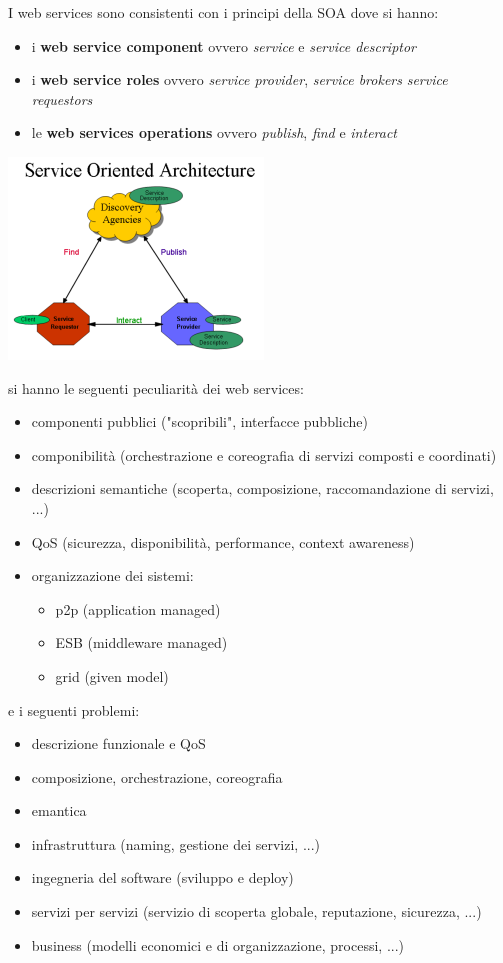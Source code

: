 \documentclass[a4paper,12pt, oneside]{book}
\begin{document}
I web services sono consistenti con i principi della SOA dove si hanno:
\begin{itemize}
\item i \textbf{web service component} ovvero \textit{service} e \textit{service descriptor}
\item i \textbf{web service roles} ovvero \textit{service provider}, \textit{service brokers} \textit{service requestors}
\item le \textbf{web services operations} ovvero \textit{publish}, \textit{find} e \textit{interact}
\end{itemize}
\begin{center}
\includegraphics[scale=1]{img/soa.png}
\end{center}
si hanno le seguenti peculiarità dei web services:
\begin{itemize}
\item componenti pubblici ("scopribili", interfacce pubbliche)
\item componibilità (orchestrazione e coreografia di servizi composti e coordinati)
\item descrizioni semantiche (scoperta, composizione, raccomandazione di servizi, ...)
\item QoS (sicurezza, disponibilità, performance, context awareness)
\item organizzazione dei sistemi:
  \begin{itemize}
    \item p2p (application managed)
    \item ESB (middleware managed)
    \item grid (given model)
  \end{itemize}
\end{itemize}
e i seguenti problemi:
\begin{itemize}
\item descrizione funzionale e QoS
\item composizione, orchestrazione, coreografia
\item emantica
\item infrastruttura (naming, gestione dei servizi, ...)
\item ingegneria del software (sviluppo e deploy)
\item servizi per servizi (servizio di scoperta globale, reputazione, sicurezza, ...)
\item business (modelli economici e di organizzazione, processi, ...)
\end{itemize}
\end{document}
